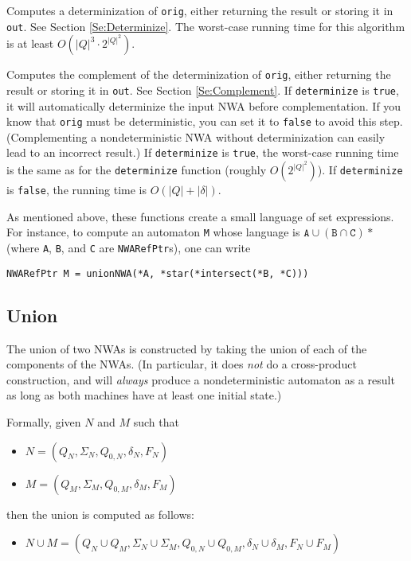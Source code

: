 \begin{functionlist}
    Computes a determinization of \texttt{orig}, either returning the
    result or storing it in \texttt{out}.
    See Section \ref{Se:Determinize}. The worst-case running time for this
    algorithm is at least $O({|Q|^3} \cdot2^{|Q|^2})$.

    Computes the complement of the determinization of \texttt{orig},
    either returning the result or storing it in \texttt{out}.
    See Section
    \ref{Se:Complement}. If \texttt{determinize} is \texttt{true}, it will
    automatically determinize the input NWA before complementation. If you
    know that \texttt{orig} must be deterministic, you can set it to
    \texttt{false} to avoid this step. (Complementing a nondeterministic NWA
    without determinization can easily lead to an incorrect result.) If
    \texttt{determinize} is \texttt{true}, the worst-case running time is the
    same as for the \texttt{determinize} function (roughly
    $O(2^{|Q|^2})$). If \texttt{determinize} is \texttt{false}, the running
    time is $O(|Q|+|\delta|)$.

\end{functionlist}

As mentioned above, these functions create a small language of set
expressions. For instance, to compute an automaton \texttt{M} whose language
is $\texttt{A} \cup (\texttt{B} \cap \texttt{C})*$ (where \texttt{A},
\texttt{B}, and \texttt{C} are \texttt{NWARefPtr}s), one can write
\begin{center}
  \texttt{NWARefPtr M = unionNWA(*A, *star(*intersect(*B, *C)))}
\end{center}


\subsection{Union}
\label{Se:Union}
The union of two NWAs is constructed by taking the union of each of the
components of the NWAs. (In
particular, it does \textsl{not} do a cross-product construction, and will
\textsl{always} produce a nondeterministic automaton as a result as long as
both machines have at least one initial state.)

Formally, given $N$ and $M$ such that
\begin{itemize}
 \item $N = (Q_N, \Sigma_N, Q_{0,N}, \delta_N, F_N)$
 \item $M = (Q_M, \Sigma_M, Q_{0,M}, \delta_M, F_M)$
\end{itemize}
then the union is computed as follows:
\begin{itemize}
 \item $N \cup M = (Q_N \cup Q_M, \Sigma_N \cup \Sigma_M, Q_{0,N} \cup
   Q_{0,M}, \delta_N \cup \delta_M, F_N \cup F_M)$
\end{itemize}

